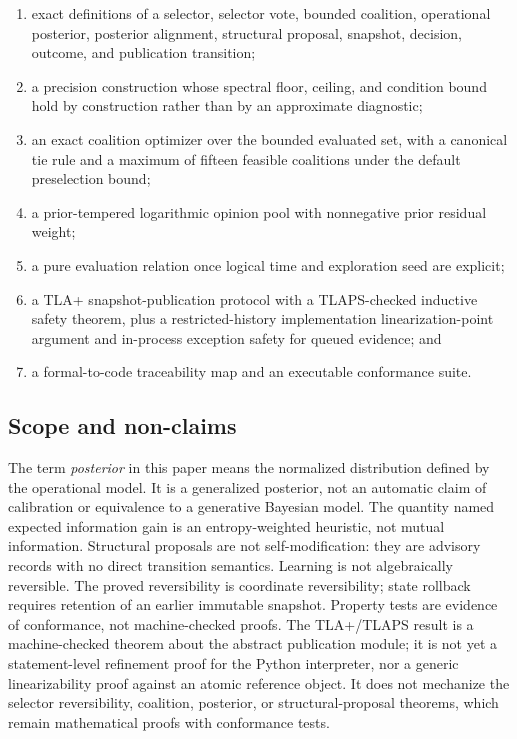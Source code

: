 \documentclass[11pt]{article}
\theoremstyle{definition}
\theoremstyle{plain}
\begin{document}
\begin{enumerate}[leftmargin=*,itemsep=2pt]
  \item exact definitions of a selector, selector vote, bounded coalition,
  operational posterior, posterior alignment, structural proposal, snapshot,
  decision, outcome, and publication transition;
  \item a precision construction whose spectral floor, ceiling, and condition
  bound hold by construction rather than by an approximate diagnostic;
  \item an exact coalition optimizer over the bounded evaluated set, with a
  canonical tie rule and a maximum of fifteen feasible coalitions under the
  default preselection bound;
  \item a prior-tempered logarithmic opinion pool with nonnegative prior
  residual weight;
  \item a pure evaluation relation once logical time and exploration seed are
  explicit;
  \item a TLA+ snapshot-publication protocol with a TLAPS-checked inductive
  safety theorem, plus a restricted-history implementation linearization-point
  argument and in-process exception safety for queued evidence; and
  \item a formal-to-code traceability map and an executable conformance suite.
\end{enumerate}

\subsection{Scope and non-claims}

The term \emph{posterior} in this paper means the normalized distribution
defined by the operational model.  It is a generalized posterior, not an
automatic claim of calibration or equivalence to a generative Bayesian model.
The quantity named expected information gain is an entropy-weighted heuristic,
not mutual information.  Structural proposals are not self-modification:
they are advisory records with no direct transition semantics.  Learning is
not algebraically reversible.  The proved reversibility is coordinate
reversibility; state rollback requires retention of an earlier immutable
snapshot.  Property tests are evidence of conformance, not machine-checked
proofs.  The TLA+/TLAPS result is a machine-checked theorem about the abstract
publication module; it is not yet a statement-level refinement proof for the
Python interpreter, nor a generic linearizability proof against an atomic
reference object.  It does not mechanize the selector reversibility, coalition,
posterior, or structural-proposal theorems, which remain mathematical proofs
with conformance tests.
\end{document}
